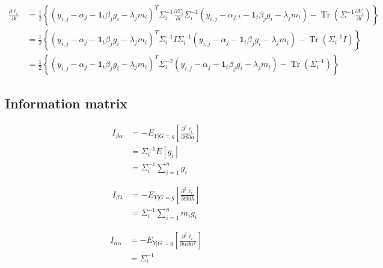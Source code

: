 \documentclass[hidelinks]{article}
\DeclareMathOperator{\Tr}{Tr}
\begin{document}
\begingroup
\large
\begin{equation*}
\begin{split}
\frac{\partial \ell_i }{\partial \epsilon} &= \frac{1}{2} \left\{ \left(y_{i,j}-\alpha_{j}-\textbf{1}_t \beta_j g_i - \lambda_j m_i\right)^T \Sigma_i^{-1} \frac{\partial \Sigma_i }{\partial \epsilon}\Sigma_i^{-1} \left(y_{i,j}-\alpha_{j,t}-\textbf{1}_t \beta_j g_i - \lambda_j m_i\right) - \Tr \left( \Sigma^{-1}  \frac{\partial V_i }{\partial \epsilon}\right) \right\}\\
&=\frac{1}{2} \left\{ \left(y_{i,j}-\alpha_{j}-\textbf{1}_t \beta_j g_i - \lambda_j m_i\right)^T \Sigma_i^{-1} I \Sigma_i^{-1}  \left(y_{i,j}-\alpha_{j}-\textbf{1}_t \beta_j g_i - \lambda_j m_i\right) - \Tr \left( \Sigma_i^{-1} I\right) \right\}\\
&=\frac{1}{2} \left\{ \left(y_{i,j}-\alpha_{j}-\textbf{1}_t \beta_j g_i - \lambda_j m_i\right)^T \Sigma_i^{-2} \left(y_{i,j}-\alpha_{j}-\textbf{1}_t \beta_j g_i - \lambda_j m_i\right) - \Tr \left( \Sigma_i^{-1}\right) \right\}
\end{split}
\end{equation*}
\endgroup

\subsection{Information matrix}

\begingroup
\large
\begin{equation*}
\begin{split}
I_{\beta\alpha} &= - E_{Y|G=g}\left[ \frac{\partial^2 \ell_i }{\partial \beta \partial \alpha}\right]\\
&= \Sigma_i^{-1} E[g_i] \\
&= \Sigma_i^{-1} \sum\limits_{i=1}^n g_i
\end{split}
\end{equation*}
\endgroup

\begingroup
\large
\begin{equation*}
\begin{split}
I_{\beta\lambda} &= - E_{Y|G=g}\left[ \frac{\partial^2 \ell_i }{\partial \beta \partial \lambda}\right]\\
&= \Sigma_i^{-1} \sum\limits_{i=1}^n m_i g_i
\end{split}
\end{equation*}
\endgroup

\begingroup
\large
\begin{equation*}
\begin{split}
I_{\alpha\alpha} &= - E_{Y|G=g}\left[ \frac{\partial^2 \ell_i }{\partial \alpha \partial \alpha^T}\right]\\
&= \Sigma_i^{-1}
\end{split}
\end{equation*}
\endgroup
\end{document}

